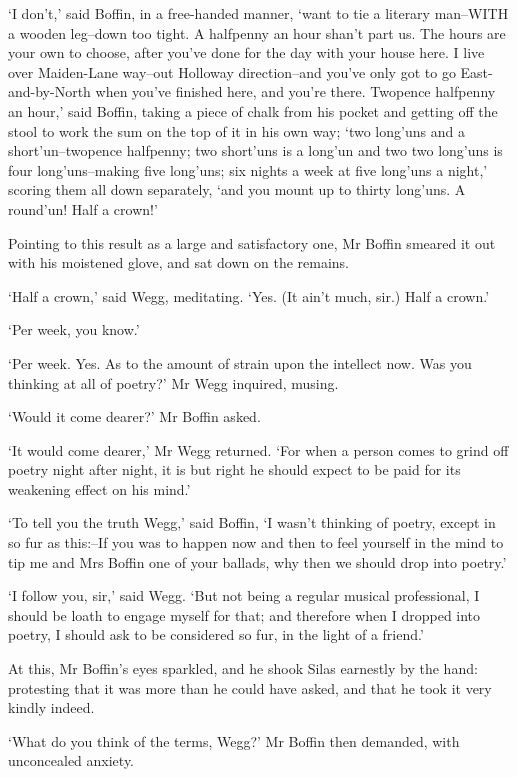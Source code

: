 ‘I don’t,’ said Boffin, in a free-handed manner, ‘want to tie a literary
man--WITH a wooden leg--down too tight. A halfpenny an hour shan’t part
us. The hours are your own to choose, after you’ve done for the day
with your house here. I live over Maiden-Lane way--out Holloway
direction--and you’ve only got to go East-and-by-North when you’ve
finished here, and you’re there. Twopence halfpenny an hour,’ said
Boffin, taking a piece of chalk from his pocket and getting off the
stool to work the sum on the top of it in his own way; ‘two long’uns and
a short’un--twopence halfpenny; two short’uns is a long’un and two two
long’uns is four long’uns--making five long’uns; six nights a week at
five long’uns a night,’ scoring them all down separately, ‘and you mount
up to thirty long’uns. A round’un! Half a crown!’

Pointing to this result as a large and satisfactory one, Mr Boffin
smeared it out with his moistened glove, and sat down on the remains.

‘Half a crown,’ said Wegg, meditating. ‘Yes. (It ain’t much, sir.) Half
a crown.’

‘Per week, you know.’

‘Per week. Yes. As to the amount of strain upon the intellect now. Was
you thinking at all of poetry?’ Mr Wegg inquired, musing.

‘Would it come dearer?’ Mr Boffin asked.

‘It would come dearer,’ Mr Wegg returned. ‘For when a person comes to
grind off poetry night after night, it is but right he should expect to
be paid for its weakening effect on his mind.’

‘To tell you the truth Wegg,’ said Boffin, ‘I wasn’t thinking of poetry,
except in so fur as this:--If you was to happen now and then to feel
yourself in the mind to tip me and Mrs Boffin one of your ballads, why
then we should drop into poetry.’

‘I follow you, sir,’ said Wegg. ‘But not being a regular musical
professional, I should be loath to engage myself for that; and therefore
when I dropped into poetry, I should ask to be considered so fur, in the
light of a friend.’

At this, Mr Boffin’s eyes sparkled, and he shook Silas earnestly by the
hand: protesting that it was more than he could have asked, and that he
took it very kindly indeed.

‘What do you think of the terms, Wegg?’ Mr Boffin then demanded, with
unconcealed anxiety.

